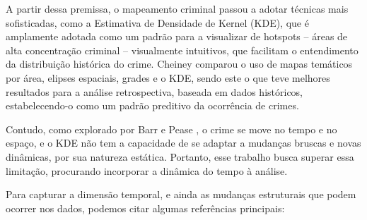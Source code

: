 A partir dessa premissa, o mapeamento criminal passou a adotar técnicas mais sofisticadas, como a Estimativa de Densidade de Kernel (KDE), que é amplamente adotada como um padrão para a visualizar de hotspots -- áreas de alta concentração criminal -- visualmente intuitivos, que facilitam o entendimento da distribuição histórica do crime. Cheiney \cite{Chainey2008} comparou o uso de mapas temáticos por área, elipses espaciais, grades e o KDE, sendo este o que teve melhores resultados para a análise retrospectiva, baseada em dados históricos, estabelecendo-o como um padrão preditivo da ocorrência de crimes.

Contudo, como explorado por Barr e Pease \cite{Barr1990}, o crime se move no tempo e no espaço, e o KDE não tem a capacidade de se adaptar a mudanças bruscas e novas dinâmicas, por sua natureza estática. Portanto, esse trabalho busca superar essa limitação, procurando incorporar a dinâmica do tempo à análise.

Para capturar a dimensão temporal, e ainda as mudanças estruturais que podem ocorrer nos dados, podemos citar algumas referências principais:

